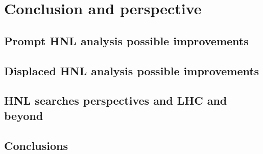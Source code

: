 
\chapter{Conclusion and perspective} %

\label{Chapter7} %

\section{Prompt HNL analysis possible improvements}
\section{Displaced HNL analysis possible improvements}
\section {HNL searches perspectives and LHC and beyond}


\section{Conclusions}
